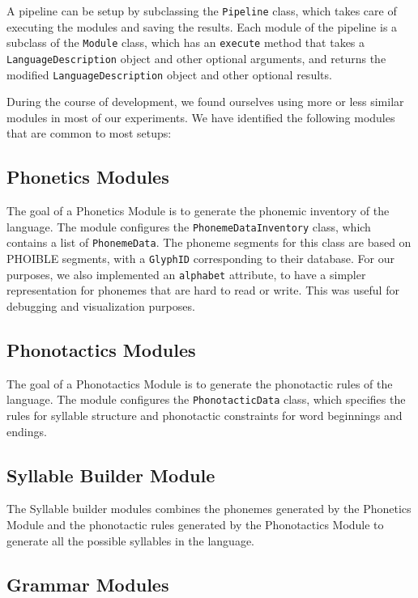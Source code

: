 A pipeline can be setup by subclassing the \texttt{Pipeline} class, which takes care of executing the modules and saving the results. Each module of the pipeline 
is a subclass of the \texttt{Module} class, which has an \texttt{execute} method that takes a \texttt{LanguageDescription} object and other optional arguments,
and returns the modified \texttt{LanguageDescription} object and other optional results.

During the course of development, we found ourselves using more or less similar modules in most of our experiments. We have identified the following modules that are common to most
setups:

\subsection{Phonetics Modules}

The goal of a Phonetics Module is to generate the phonemic inventory of the language. The module configures the \texttt{PhonemeDataInventory} class, which
contains a list of \texttt{PhonemeData}. The phoneme segments for this class are based on PHOIBLE \cite{phoible} segments, with a \texttt{GlyphID} corresponding
to their database. For our purposes, we also implemented an \texttt{alphabet} attribute, to have a simpler representation for phonemes that are
hard to read or write. This was useful for debugging and visualization purposes.

\subsection{Phonotactics Modules}
The goal of a Phonotactics Module is to generate the phonotactic rules of the language. The module configures the \texttt{PhonotacticData} class, which
specifies the rules for syllable structure and phonotactic constraints for word beginnings and endings.

\subsection{Syllable Builder Module}
The Syllable builder modules combines the phonemes generated by the Phonetics Module and the phonotactic rules generated by the Phonotactics Module to
generate all the possible syllables in the language.

\subsection{Grammar Modules}

